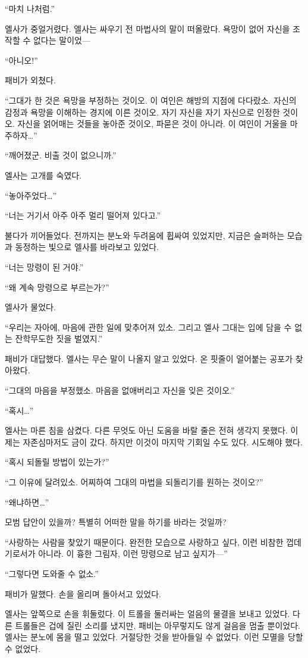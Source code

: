 ``마치 나처럼.''

엘사가 중얼거렸다. 엘사는 싸우기 전 마법사의 말이 떠올랐다. 욕망이 없어 자신을 조작할 수 없다는 말이었—

``아니오!''

패비가 외쳤다.

``그대가 한 것은 욕망을 부정하는 것이오. 이 여인은 해방의 지점에 다다랐소. 자신의 감정과 욕망을 이해하는 경지에 이른 것이오. 자기 자신을 자기 자신으로 인정한 것이오. 자신을 얽어매는 것들을 놓아준 것이오, 파묻은 것이 아니라. 이 여인이 거울을 마주하자\ldots''

``깨어졌군. 비출 것이 없으니까.''

엘사는 고개를 숙였다.

``놓아주었다\ldots''

``너는 거기서 아주 아주 멀리 떨어져 있다고.''

불다가 끼어들었다. 전까지는 분노와 두려움에 휩싸여 있었지만, 지금은 슬퍼하는 모습과 동정하는 빛으로 엘사를 바라보고 있었다.

``너는 망령이 된 거야.''

``왜 계속 망령으로 부르는가?''

엘사가 물었다.

``우리는 자아에, 마음에 관한 일에 맞추어져 있소. 그리고 엘사 그대는 입에 담을 수 없는 잔학무도한 짓을 벌였지.''

패비가 대답했다. 엘사는 무슨 말이 나올지 알고 있었다. 온 핏줄이 얼어붙는 공포가 찾아왔다.

``그대의 마음을 부정했소. 마음을 없애버리고 자신을 잊은 것이오.''

``혹시\ldots''

엘사는 마른 침을 삼켰다. 다른 무엇도 아닌 도움을 바랄 줄은 전혀 생각지 못했다. 이제는 자존심마저도 금이 갔다. 하지만 이것이 마지막 기회일 수도 있다. 시도해야 했다.

``혹시 되돌릴 방법이 있는가?''

``그 이유에 달려있소. 어찌하여 그대의 마법을 되돌리기를 원하는 것이오?''

``왜냐하면\ldots''

모범 답안이 있을까? 특별히 어떠한 말을 하기를 바라는 것일까?

``사랑하는 사람을 찾았기 때문이다. 완전한 모습으로 사랑하고 싶다, 이런 비참한 껍데기로서가 아니라. 이 흉한 그림자, 이런 망령으로 남고 싶지가—''

``그렇다면 도와줄 수 없소.''

패비가 말했다. 손을 올리며 돌아서고 있었다.

엘사는 앞쪽으로 손을 휘둘렀다. 이 트롤을 둘러싸는 얼음의 물결을 보내고 있었다. 다른 트롤들은 겁에 질린 소리를 냈지만, 패비는 아무렇지도 않게 걸음을 멈출 뿐이었다. 엘사는 분노에 몸을 떨고 있었다. 거절당한 것을 받아들일 수 없었다. 이런 모멸을 당할 수 없었다.

